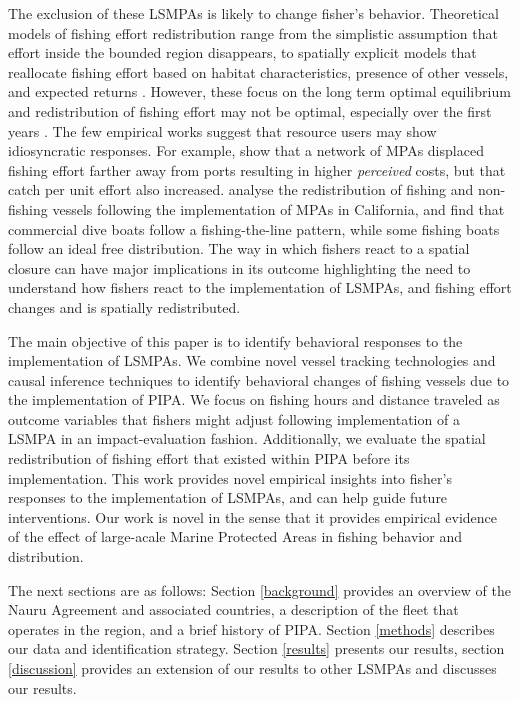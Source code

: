 \documentclass[11pt,]{article}
\begin{document}
The exclusion of these LSMPAs is likely to change fisher's behavior.
Theoretical models of fishing effort redistribution range from the
simplistic assumption that effort inside the bounded region disappears,
to spatially explicit models that reallocate fishing effort based on
habitat characteristics, presence of other vessels, and expected returns
\citep{smith_2003,hilborn_2006}. However, these focus on the long term
optimal equilibrium and redistribution of fishing effort may not be
optimal, especially over the first years \citep{stevenson_2013}. The few
empirical works suggest that resource users may show idiosyncratic
responses. For example, \citet{stevenson_2013} show that a network of
MPAs displaced fishing effort farther away from ports resulting in
higher \emph{perceived} costs, but that catch per unit effort also
increased. \citet{cabral_2017} analyse the redistribution of fishing and
non-fishing vessels following the implementation of MPAs in California,
and find that commercial dive boats follow a fishing-the-line pattern,
while some fishing boats follow an ideal free distribution. The way in
which fishers react to a spatial closure can have major implications in
its outcome \citep{smith_2003,hilborn_2006} highlighting the need to
understand how fishers react to the implementation of LSMPAs, and
fishing effort changes and is spatially redistributed.

The main objective of this paper is to identify behavioral responses to
the implementation of LSMPAs. We combine novel vessel tracking
technologies and causal inference techniques to identify behavioral
changes of fishing vessels due to the implementation of PIPA. We focus
on fishing hours and distance traveled as outcome variables that fishers
might adjust following implementation of a LSMPA in an impact-evaluation
fashion. Additionally, we evaluate the spatial redistribution of fishing
effort that existed within PIPA before its implementation. This work
provides novel empirical insights into fisher's responses to the
implementation of LSMPAs, and can help guide future interventions. Our
work is novel in the sense that it provides empirical evidence of the
effect of large-acale Marine Protected Areas in fishing behavior and
distribution.

The next sections are as follows: Section \ref{background} provides an
overview of the Nauru Agreement and associated countries, a description
of the fleet that operates in the region, and a brief history of PIPA.
Section \ref{methods} describes our data and identification strategy.
Section \ref{results} presents our results, section \ref{discussion}
provides an extension of our results to other LSMPAs and discusses our
results.
\end{document}

